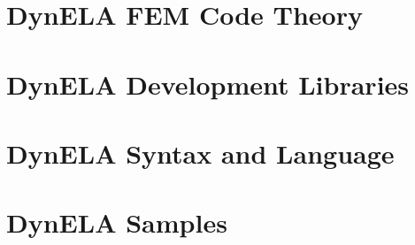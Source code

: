 \documentclass[11pt,english,twoside]{book}
\begin{document}


\dominitoc{}\setcounter{page}{1}

\tableofcontents

\listoffigures

\listoftables

\cleardoublepage

\renewcommand{\thepage}{\arabic{page}}\setcounter{page}{1}







\part{DynELA FEM Code Theory}



\cleardoublepage

\part{DynELA Development Libraries}













\cleardoublepage

\part{DynELA Syntax and Language}







\cleardoublepage

\part{DynELA Samples}
\end{document}
